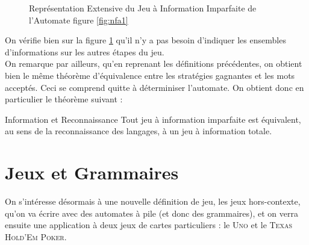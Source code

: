 \documentclass{cours}
\begin{document}
\begin{figure}
    \caption{Représentation Extensive du Jeu à Information Imparfaite de l'Automate figure \ref{fig:nfa1}}
    \label{fig:gametree:nfa1}
\end{figure}
On vérifie bien sur la figure \ref{fig:gametree:nfa1} qu'il n'y a pas besoin d'indiquer les ensembles d'informations sur les autres étapes du jeu.\\
On remarque par ailleurs, qu'en reprenant les définitions précédentes, on obtient bien le même théorème d'équivalence entre les stratégies gagnantes et les mots acceptés. Ceci se comprend quitte à déterminiser l'automate. On obtient donc en particulier le théorème suivant : 
\begin{théorème}{Information et Reconnaissance}{}
    Tout jeu à information imparfaite est équivalent, au sens de la reconnaissance des langages, à un jeu à information totale. 
\end{théorème}

\newpage
\section{Jeux et Grammaires}
On s'intéresse désormais à une nouvelle définition de jeu, les jeux hors-contexte, qu'on va écrire avec des automates à pile (et donc des grammaires), et on verra ensuite une application à deux jeux de cartes particuliers : le \textsc{Uno} et le \textsc{Texas Hold'Em Poker}. 
\end{document}
